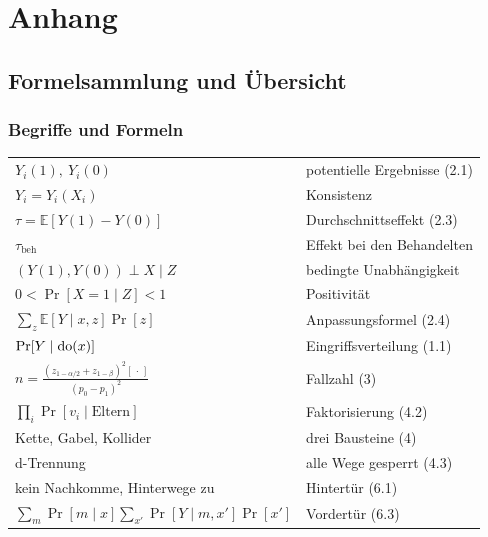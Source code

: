 \appendix
\part{Anhang}

\newcommand{\lit}[3]{\vspace{5pt}\noindent\textbf{[#1]} #2\par\nopagebreak\vspace{1pt}{\small\itshape\color{grau} #3}\par\vspace{2pt}}

\chapter{Formelsammlung und Übersicht}

\section{Begriffe und Formeln}

\begin{merksatz}
\begin{center}
{\small
\renewcommand{\arraystretch}{1.6}
\begin{tabular}{@{}P{4.4cm}P{4.2cm}@{}}
\toprule
$Y_i(1),\ Y_i(0)$ & potentielle Ergebnisse (2.1)\\
$Y_i = Y_i(X_i)$ & Konsistenz\\
$\tau = \mathbb{E}[Y(1)-Y(0)]$ & Durchschnittseffekt (2.3)\\
$\tau_{\text{beh}}$ & Effekt bei den Behandelten\\
$(Y(1),Y(0)) \perp X \mid Z$ & bedingte Unabhängigkeit\\
$0 < \Pr[X{=}1\mid Z] < 1$ & Positivität\\
$\sum_z \mathbb{E}[Y\mid x,z]\Pr[z]$ & Anpassungsformel (2.4)\\
$\Pr[Y\mid\operatorname{do}(x)]$ & Eingriffsverteilung (1.1)\\
$n = \frac{(z_{1-\alpha/2}+z_{1-\beta})^{2}[\,\cdot\,]}{(p_0-p_1)^{2}}$ & Fallzahl (3)\\
$\prod_i \Pr[v_i \mid \text{Eltern}]$ & Faktorisierung (4.2)\\
Kette, Gabel, Kollider & drei Bausteine (4)\\
d-Trennung & alle Wege gesperrt (4.3)\\
kein Nachkomme, Hinterwege zu & Hintertür (6.1)\\
$\sum_m \Pr[m\mid x]\sum_{x'}\Pr[Y\mid m,x']\Pr[x']$ & Vordertür (6.3)\\
\bottomrule
\end{tabular}}
\end{center}
\end{merksatz}

